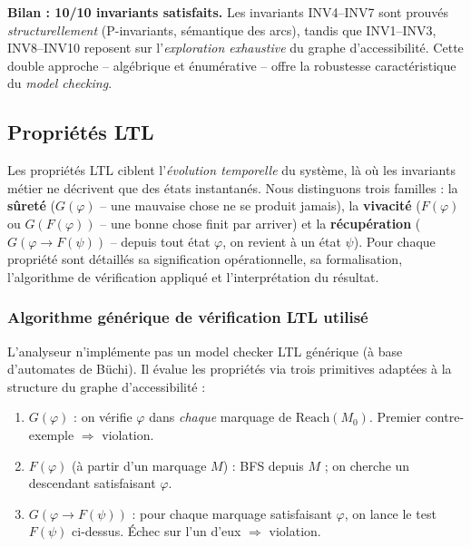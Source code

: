 \documentclass[11pt,a4paper]{article}
\begin{document}
\noindent
\textbf{Bilan : 10/10 invariants satisfaits.} Les invariants INV4--INV7 sont
prouvés \emph{structurellement} (P-invariants, sémantique des arcs), tandis
que INV1--INV3, INV8--INV10 reposent sur l'\emph{exploration exhaustive} du
graphe d'accessibilité. Cette double approche -- algébrique et énumérative
-- offre la robustesse caractéristique du \emph{model checking}.

\subsection{Propriétés LTL}

Les propriétés LTL ciblent l'\emph{évolution temporelle} du système, là où
les invariants métier ne décrivent que des états instantanés. Nous
distinguons trois familles : la \textbf{sûreté} ($G(\varphi)$ -- une mauvaise
chose ne se produit jamais), la \textbf{vivacité} ($F(\varphi)$ ou
$G(F(\varphi))$ -- une bonne chose finit par arriver) et la
\textbf{récupération} ($G(\varphi \rightarrow F(\psi))$ -- depuis tout état
$\varphi$, on revient à un état $\psi$). Pour chaque propriété sont
détaillés sa signification opérationnelle, sa formalisation, l'algorithme
de vérification appliqué et l'interprétation du résultat.

\subsubsection*{Algorithme générique de vérification LTL utilisé}

L'analyseur n'implémente pas un model checker LTL générique (à base
d'automates de Büchi). Il évalue les propriétés via trois primitives
adaptées à la structure du graphe d'accessibilité :

\begin{enumerate}[leftmargin=1.2cm,itemsep=2pt]
  \item \textbf{$G(\varphi)$} : on vérifie $\varphi$ dans \emph{chaque}
        marquage de $\mathrm{Reach}(M_0)$. Premier contre-exemple $\Rightarrow$
        violation.
  \item \textbf{$F(\varphi)$} (à partir d'un marquage $M$) : BFS depuis $M$
        ; on cherche un descendant satisfaisant $\varphi$.
  \item \textbf{$G(\varphi \rightarrow F(\psi))$} : pour chaque marquage
        satisfaisant $\varphi$, on lance le test $F(\psi)$ ci-dessus.
        Échec sur l'un d'eux $\Rightarrow$ violation.
\end{enumerate}
\end{document}
